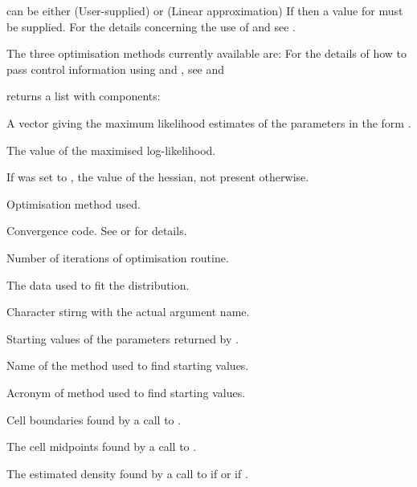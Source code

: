\begin{Details}\relax
{} can be either (User-supplied) or
 (Linear approximation)
If  then a value for  must be
supplied. For the details concerning the use of 
and  see .

The three optimisation methods currently available are:
For the details of how to pass control information using
 and , see  and
\end{Details}
\begin{Value}
 returns a list with components:
\begin{ldescription}
\item[\code{param}] A vector giving the maximum likelihood estimates of the
parameters in the form .
\item[\code{maxLik}] The value of the maximised log-likelihood.
\item[\code{hessian}] If  was set to , the value of
the hessian, not present otherwise.
\item[\code{method}] Optimisation method used.
\item[\code{conv}] Convergence code. See  or
 for details.
\item[\code{iter}] Number of iterations of optimisation routine.
\item[\code{x}] The data used to fit the distribution.
\item[\code{xName}] Character stirng with the actual  argument name.
\item[\code{paramStart}] Starting values of the parameters returned by
.
\item[\code{svName}] Name of the method used to find starting values.
\item[\code{startValues}] Acronym of method used to find starting values.
\item[\code{breaks}] Cell boundaries found by a call to .
\item[\code{midpoints}] The cell midpoints found by a call to
.
\item[\code{empDens}] The estimated density found by a call to
 if  or
 if .
\end{ldescription}
\end{Value}
